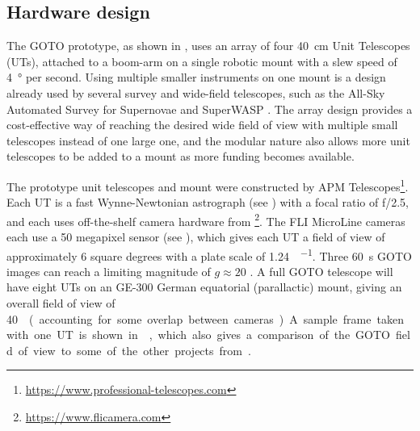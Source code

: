 \subsection{Hardware design}
\label{sec:goto_design}
\begin{colsection}

The GOTO prototype, as shown in , uses an array of four \SI{40}{\cm} Unit Telescopes (UTs), attached to a boom-arm on a single robotic mount with a slew speed of \SI{4}{\degree} per second. Using multiple smaller instruments on one mount is a design already used by several survey and wide-field telescopes, such as the All-Sky Automated Survey for Supernovae  \citep[ASAS-SN,][]{ASAS-SN} and SuperWASP  \citep[Wide Angle Search for Planets,][]{SuperWASP}. The array design provides a cost-effective way of reaching the desired wide field of view with multiple small telescopes instead of one large one, and the modular nature also allows more unit telescopes to be added to a mount as more funding becomes available.

\newpage

The prototype unit telescopes and mount were constructed by APM Telescopes\footnote{\url{https://www.professional-telescopes.com}}. Each UT is a fast Wynne-Newtonian astrograph (see ) with a focal ratio of f/2.5, and each uses off-the-shelf camera hardware from \footnote{\url{https://www.flicamera.com}}. The FLI MicroLine cameras each use a 50 megapixel sensor (see ), which gives each UT a field of view of approximately 6 square degrees with a plate scale of \SI[per-mode=symbol]{1.24}{\arcsec\per\pixel}. Three \SI{60}{\second} GOTO images can reach a limiting magnitude of $g \approx 20$ \citep[see ;][]{S190425z_GOTO}. A full GOTO telescope will have eight UTs on an GE-300 German equatorial (parallactic) mount, giving an overall field of view of \SI{40}{\square\deg} (accounting for some overlap between cameras). A sample frame taken with one UT is shown in , which also gives a comparison of the GOTO field of view to some of the other projects from .


\end{colsection}
